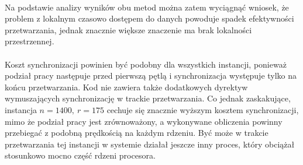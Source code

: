 \documentclass[12pt,a4paper]{article}
\begin{document}
\\
Na podstawie analizy wyników obu metod można zatem wyciągnąć wniosek, że problem z lokalnym czasowo dostępem do danych powoduje spadek efektywności przetwarzania, jednak znacznie większe znaczenie ma brak lokalności przestrzennej.\\
\\
Koszt synchronizacji powinien być podobny dla wszystkich instancji, ponieważ podział pracy następuje przed pierwszą pętlą i synchronizacja występuje tylko na końcu przetwarzania. Kod nie zawiera także dodatkowych dyrektyw wymuszających synchronizację w trackie przetwarzania. Co jednak zaskakujące, instancja $n=1400,~r=175$ cechuje się znacznie wyższym kosztem synchronizacji, mimo że podział pracy jest zrównoważony, a wykonywane obliczenia powinny przebiegać z podobną prędkością na każdym rdzeniu. Być może w trakcie przetwarzania tej instancji w systemie działał jeszcze inny proces, który obciążał stosunkowo mocno część rdzeni procesora.
\end{document}
